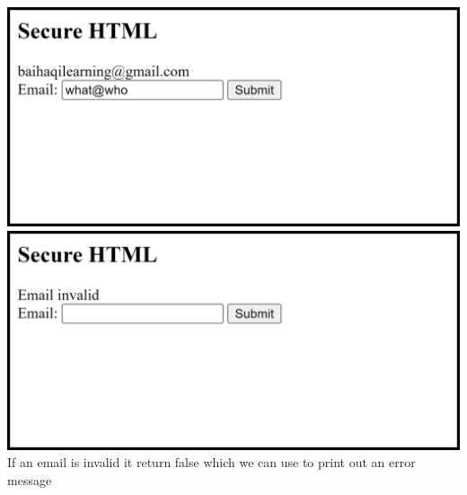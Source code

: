 \documentclass[12pt,titlepage]{article}
\begin{document}
\begin{enumerate}
\begin{enumerate}
        \newpage
        
        \includegraphics[width=.85\textwidth]{images/figures/fig4.2_c.png} \\
        \includegraphics[width=.85\textwidth]{images/figures/fig4.2_d.png} \\
        If an email is invalid it return false which we can use to print out an error message
    \end{enumerate}

    \newpage


\end{enumerate}
\end{document}
